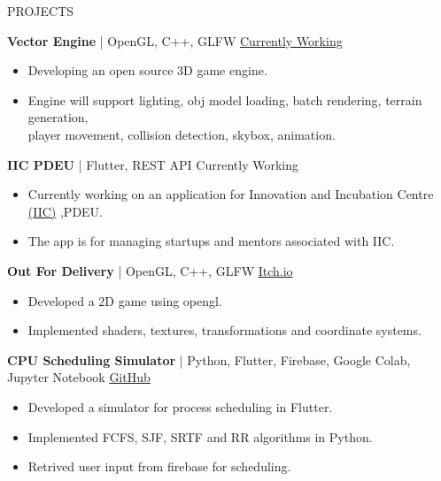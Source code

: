 \documentclass{resume}
\begin{document}
\begin{rSection}{PROJECTS}
\vspace{-1.25em}
\item \textbf{Vector Engine} | {OpenGL, C++, GLFW} \hfill \href{https://github.com/JayNakum/VectorEngine}{Currently Working}
 \begin{itemize}
    \itemsep -3pt {} 
    \item Developing an open source 3D game engine.
    \item Engine will support lighting, obj model loading, batch rendering, terrain generation,\\player movement, collision detection, skybox, animation.
 \end{itemize}

\item \textbf{IIC PDEU} | {Flutter, REST API} \hfill {Currently Working}
\begin{itemize}
    \itemsep -3pt {} 
    \item Currently working on an application for Innovation and Incubation Centre \href{https://iic.pdpu.ac.in/en}{(IIC)} ,PDEU.
    \item The app is for managing startups and mentors associated with IIC.
 \end{itemize}

\item \textbf{Out For Delivery} | {OpenGL, C++, GLFW} \hfill \href{https://jaynakum.itch.io/out-for-delivery}{Itch.io}
\begin{itemize}
    \itemsep -3pt {} 
    \item Developed a 2D game using opengl.
    \item Implemented shaders, textures, transformations and coordinate systems.
 \end{itemize}

\item \textbf{CPU Scheduling Simulator} | {Python, Flutter, Firebase, Google Colab, Jupyter Notebook} \hfill \href{https://github.com/JayNakum/OperatingSystemsProject}{GitHub}
\begin{itemize}
    \itemsep -3pt {} 
    \item Developed a simulator for process scheduling in Flutter.
    \item Implemented FCFS, SJF, SRTF and RR algorithms in Python.
    \item Retrived user input from firebase for scheduling.
 \end{itemize}


\end{rSection}
\end{document}
